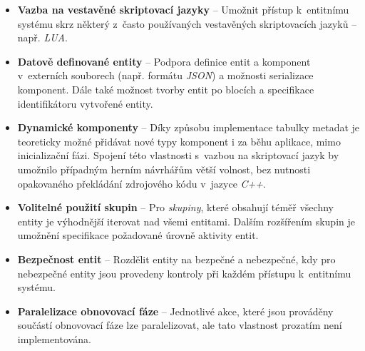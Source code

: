 \begin{itemize}
	\item \textbf{Vazba na vestavěné skriptovací jazyky} -- Umožnit přístup k~entitnímu systému skrz některý z~často používaných vestavěných skriptovacích jazyků -- např. \emph{LUA}. 
	\item \textbf{Datově definované entity} -- Podpora definice entit a komponent v~externích souborech (např. formátu \emph{JSON}) a možnosti serializace komponent. Dále také možnost tvorby entit po blocích a specifikace identifikátoru vytvořené entity.
	\item \textbf{Dynamické komponenty} -- Díky způsobu implementace tabulky metadat je teoreticky možné přidávat nové typy komponent i za běhu aplikace, mimo inicializační fázi. Spojení této vlastnosti s~vazbou na skriptovací jazyk by umožnilo případným herním návrhářům větší volnost, bez nutnosti opakovaného překládání zdrojového kódu v~jazyce \emph{C++}.
	\item \textbf{Volitelné použití skupin} -- Pro \emph{skupiny}, které obsahují téměř všechny entity je výhodnější iterovat nad všemi entitami. Dalším rozšířením skupin je umožnění specifikace požadované úrovně aktivity entit.
	\item \textbf{Bezpečnost entit} -- Rozdělit entity na bezpečné a nebezpečné, kdy pro nebezpečné entity jsou provedeny kontroly při každém přístupu k~entitnímu systému.
	\item \textbf{Paralelizace obnovovací fáze} -- Jednotlivé akce, které jsou prováděny součástí obnovovací fáze lze paralelizovat, ale tato vlastnost prozatím není implementována.
\end{itemize}




